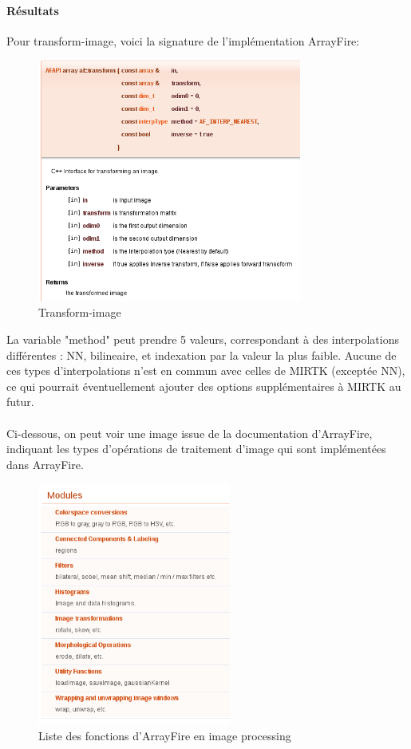\documentclass{report}
\begin{document}
\paragraph{Résultats}
Pour transform-image, voici la signature de l'implémentation ArrayFire:
\begin{figure}[h!]
	\begin{center}
		\includegraphics[height=8cm]{figures/transform_af.png}
	\end{center}	
	\caption{Transform-image}
	\label{Transform-image}
\end{figure}
\newline

La variable "method" peut prendre 5 valeurs, correspondant à des interpolations différentes : NN, bilineaire, et indexation par la valeur la plus faible. Aucune de ces types d'interpolations n'est en commun avec celles de MIRTK (exceptée NN), ce qui pourrait éventuellement ajouter des options supplémentaires à MIRTK au futur.
\\
\\
Ci-dessous, on peut voir une image issue de la documentation d'ArrayFire, indiquant les types d'opérations de traitement d'image qui sont implémentées dans ArrayFire.
\begin{figure}[h!]
	\begin{center}
		\includegraphics[height=8cm]{figures/list_functions.png}
	\end{center}	
	\caption{Liste des fonctions d'ArrayFire en image processing}
	\label{Liste des fonctions d'ArrayFire en image processing}
\end{figure}
\end{document}
